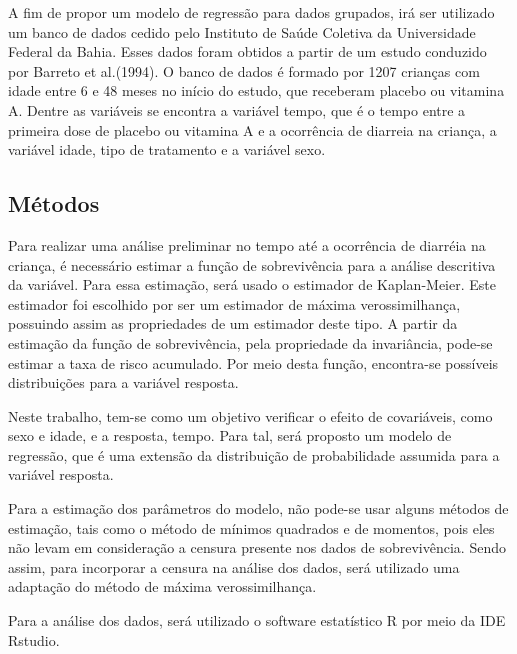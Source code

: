 \documentclass[a4paper,12pt]{article}
\begin{document}
A fim de propor um modelo de regressão para dados grupados, irá ser utilizado um banco de dados cedido pelo Instituto de Saúde Coletiva da Universidade Federal da Bahia. Esses dados foram obtidos a partir de um estudo conduzido por Barreto et al.(1994). O banco de dados é formado por 1207 crianças com idade entre 6 e 48 meses no início do estudo, que receberam placebo ou vitamina A. Dentre as variáveis se encontra a variável tempo, que é o tempo entre a primeira dose de placebo ou vitamina A e a ocorrência de diarreia na criança, a variável idade, tipo de tratamento e a variável sexo.

\subsection{Métodos}

Para realizar uma análise preliminar no tempo até a ocorrência de diarréia na criança, é necessário estimar a função de sobrevivência para a análise descritiva da variável. Para essa estimação, será usado o estimador de Kaplan-Meier. Este estimador foi escolhido por ser um estimador de máxima verossimilhança, possuindo assim as propriedades de um estimador deste tipo. A partir da estimação da função de sobrevivência, pela propriedade da invariância, pode-se estimar a taxa de risco acumulado. Por meio desta função, encontra-se possíveis distribuições para a variável resposta.

Neste trabalho, tem-se como um objetivo verificar o efeito de covariáveis, como sexo e idade, e a resposta, tempo. Para tal, será proposto um modelo de regressão, que é uma extensão da distribuição de probabilidade assumida para a variável resposta.

Para a estimação dos parâmetros do modelo, não pode-se usar alguns métodos de estimação, tais como o método de mínimos quadrados e de momentos, pois eles não levam em consideração a censura presente nos dados de sobrevivência. Sendo assim, para incorporar a censura na análise dos dados, será utilizado uma adaptação do método de máxima verossimilhança.

Para a análise dos dados, será utilizado o software estatístico R por meio da IDE Rstudio.


\newpage



\end{document}
